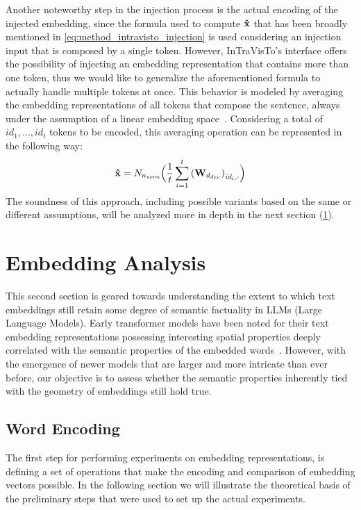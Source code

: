 Another noteworthy step in the injection process is the actual encoding of the injected embedding, since the formula used to compute $\bm{\mathbf{\hat x}}$ that has been broadly mentioned in \cref{eq:method_intravisto_injection} is used considering an injection input that is composed by a single token.
However, InTraVisTo's interface offers the possibility of injecting an embedding representation that contains more than one token, thus we would like to generalize the aforementioned formula to actually handle multiple tokens at once.
 This behavior is modeled by averaging the embedding representations of all tokens that compose the sentence, always under the assumption of a linear embedding space~\cite{mikolov2013,park2023}. 
Considering a total of $id_1,\ldots,id_t$ tokens to be encoded, this averaging operation can be represented in the following way:
\begin{equation}
    \label{eq:method_intravisto_emb-avg}
    \bm{\mathbf{\hat x}} = N_{n_\textit{norm}}\Bigl(\frac{1}{t} \sum_{i=1}^{t}{{(\bm{\mathbf{W}}_{d_{dec}})}_{\textit{id}_{i},\cdot}}\Bigr)
\end{equation}
The soundness of this approach, including possible variants based on the same or different assumptions, will be analyzed more in depth in the next section (\cref{sec:method_embeddings}).


\section{Embedding Analysis}\label{sec:method_embeddings}

This second section is geared towards understanding the extent to which text embeddings still retain some degree of semantic factuality in LLMs (Large Language Models).
Early transformer models have been noted for their text embedding representations possessing interesting spatial properties deeply correlated with the semantic properties of the embedded words~\cite{allen2019,kalinowski2020}.
However, with the emergence of newer models that are larger and more intricate than ever before, our objective is to assess whether the semantic properties inherently tied with the geometry of embeddings still hold true.

\subsection{Word Encoding}

The first step for performing experiments on embedding representations, is defining a set of operations that make the encoding and comparison of embedding vectors possible.
In the following section we will illustrate the theoretical basis of the preliminary steps that were used to set up the actual experiments.

